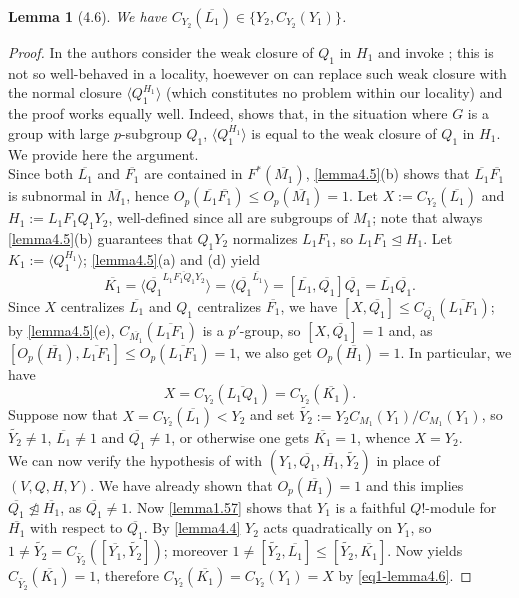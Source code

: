 \documentclass{amsart}
\numberwithin{equation}{section}
\newtheorem{lemma}[equation]{Lemma}
\theoremstyle{definition}
\theoremstyle{subresult}
\theoremstyle{caseresult}
\newcommand{\ov}{\overline}
\newcommand{\norm}{\trianglelefteq}
\newcommand{\wde}{\widetilde}
\newcommand{\<}{\langle}
\renewcommand{\>}{\rangle}
\begin{document}
\begin{lemma}[4.6]\label{lemma4.6} %
	We have $C_{Y_2}(\ov{L_1}) \in \{Y_2, C_{Y_2}(Y_1)\}$.
\end{lemma}
\begin{proof}
	In \cite[Lemma 4.6]{Meier-Stell-Stroth:2012} the authors consider the weak closure of $Q_1$ in $H_1$ and invoke \cite[Lemma 1.46(c)]{Meier-Stell-Stroth:2012}; this is not so well-behaved in a locality, hoewever on can replace such weak closure with the normal closure $\<Q_1^{H_1} \>$ (which constitutes no problem within our locality) and the proof works equally well. Indeed, \cite[Lemma 1.46(b)]{Meier-Stell-Stroth:2012} shows that, in the situation where $G$ is a group with large $p$-subgroup $Q_1$,  $\<Q_1^{H_1} \>$ is equal to the weak closure of $Q_1$ in $H_1$.\\
	We provide here the argument.\\
	
	Since both $\ov{L_1}$ and $\ov{F_1}$ are contained in $F^*(\ov{M_1})$, \ref{lemma4.5}(b) shows that $\ov{L_1}\ov{F_1}$ is subnormal in $\ov{M_1}$, hence $O_p(\ov{L_1}\ov{F_1}) \le O_p(\ov{M_1}) = 1$. Let $X:=C_{Y_2}(\ov{L_1})$ and $H_1:= L_1F_1Q_1Y_2$, well-defined since all are subgroups of $M_1$; note that always \ref{lemma4.5}(b) guarantees that $Q_1Y_2$ normalizes $L_1F_1$, so $L_1F_1 \norm H_1$. Let $K_1:=\langle Q_1^{H_1} \rangle$; \ref{lemma4.5}(a) and (d) yield
	\[
	\ov{K_1} = \langle \ov{Q_1}^{\ov{L_1F_1Q_1Y_2}} \rangle = \langle \ov{Q_1} ^{\ov{L_1}} \rangle = [\ov{L_1},\ov{Q_1}]\ov{Q_1} = \ov{L_1}\ov{Q_1}.
	\]
	Since $X$ centralizes $\ov{L_1}$ and $Q_1$ centralizes $\ov{F_1}$, we have $[X,\ov{Q_1}] \le C_{\ov{Q_1}}(\ov{L_1F_1})$; by \ref{lemma4.5}(e), $C_{\ov{M_1}}(\ov{L_1F_1})$ is a $p'$-group, so $[X,\ov{Q_1}]=1$ and, as $[O_p(\ov{H_1}),\ov{L_1F_1}] \le O_p(\ov{L_1F_1}) = 1$, we also get $O_p(\ov{H_1}) = 1$. In particular, we have
	\begin{equation*}
		\label{eq1-lemma4.6}
		\tag{$\star$}
		X=C_{Y_2}(\ov{L_1Q_1}) = C_{Y_2}(\ov{K_1}).
	\end{equation*}
	Suppose now that $X=C_{Y_2}(\ov{L_1}) < Y_2$ and set $\wde{Y_2} := Y_2C_{M_1}(Y_1)/C_{M_1}(Y_1)$, so $\wde{Y_2}\ne 1$, $\ov{L_1} \ne 1$ and $\ov{Q_1} \ne 1$, or otherwise one gets $\ov{K_1} = 1$, whence $X = Y_2$.\\
	We can now verify the hypothesis of \cite[Lemma A.57]{Meier-Stell-Stroth:2012} with $(Y_1, \ov{Q_1},\ov{H_1},\wde{Y_2})$ in place of $(V,Q,H,Y)$. We have already shown that $O_p(\ov{H_1}) = 1$ and this implies $\ov{Q_1} \not \norm \ov{H_1}$, as $\ov{Q_1} \ne 1$. Now \ref{lemma1.57} shows that $Y_1$ is a faithful $Q!$-module for $\ov{H_1}$ with respect to $\ov{Q_1}$. By \ref{lemma4.4} $Y_2$ acts quadratically on $Y_1$, so $1 \ne \wde{Y_2} = C_{\wde{Y_2}}([\ov{Y_1}, \wde{Y_2}])$; moreover $1 \ne [\wde{Y_2},\ov{L_1}] \le [\wde{Y_2},\ov{K_1}]$. Now \cite[Lemma A.57]{Meier-Stell-Stroth:2012} yields $C_{\wde{Y_2}}(\ov{K_1}) =1$, therefore $C_{Y_2}(\ov{K_1}) = C_{Y_2}(Y_1) = X$ by \eqref{eq1-lemma4.6}.
\end{proof}
\end{document}
